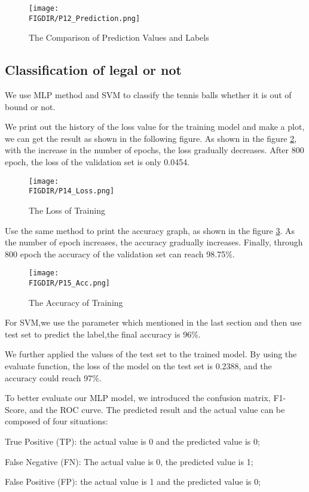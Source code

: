 \begin{figure}[ht]
\centering
\texttt{[image: \\FIGDIR/P12\_Prediction.png]}
\caption{The Comparison of Prediction Values and Labels}
\label{rnn result}
\end{figure}

\subsection{Classification of legal or not}
We use MLP method and SVM to classify the tennis balls whether it is out of bound or not.

We print out the history of the loss value for the training model and make a plot, we can get the result as shown in the following figure. As shown in the figure \ref{loss}, with the increase in the number of epochs, the loss gradually decreases. After 800 epoch, the loss of the validation set is only 0.0454. 

\begin{figure}[ht]
\centering
\texttt{[image: \\FIGDIR/P14\_Loss.png]}
\caption{The Loss of Training}
\label{loss}
\end{figure}
Use the same method to print the accuracy graph, as shown in the figure \ref{acc}. As the number of epoch increases, the accuracy gradually increases. Finally, through 800 epoch the accuracy of the validation set can reach 98.75\%.

\begin{figure}[ht]
\centering
\texttt{[image: \\FIGDIR/P15\_Acc.png]}
\caption{The Accuracy of Training}
\label{acc}
\end{figure}

For SVM,we use the parameter which mentioned in the last section and then use test set to predict the label,the final accuracy is 96\%.

We further applied the values of the test set to the trained model. By using the evaluate function, the loss of the model on the test set is 0.2388, and the accuracy could reach 97\%.

To better evaluate our MLP model, we introduced the confusion matrix, F1-Score, and the ROC curve. The predicted result and the actual value can be composed of four situations:

True Positive (TP): the actual value is 0 and the predicted value is 0;

False Negative (FN): The actual value is 0, the predicted value is 1;

False Positive (FP): the actual value is 1 and the predicted value is 0;

